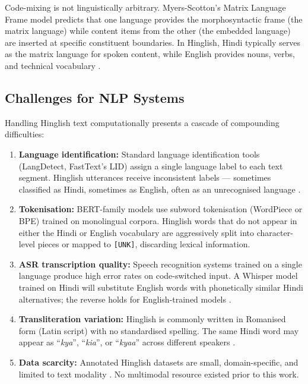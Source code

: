 Code-mixing is not linguistically arbitrary. Myers-Scotton's Matrix Language Frame model predicts that one language provides the morphosyntactic frame (the matrix language) while content items from the other (the embedded language) are inserted at specific constituent boundaries. In Hinglish, Hindi typically serves as the matrix language for spoken content, while English provides nouns, verbs, and technical vocabulary \cite{srinivasan2020code}.

\subsection{Challenges for NLP Systems}

Handling Hinglish text computationally presents a cascade of compounding difficulties:

\begin{enumerate}
    \item \textbf{Language identification:} Standard language identification tools (LangDetect, FastText's LID) assign a single language label to each text segment. Hinglish utterances receive inconsistent labels --- sometimes classified as Hindi, sometimes as English, often as an unrecognised language \cite{aguilar2020lince, barman2014code}.

    \item \textbf{Tokenisation:} BERT-family models use subword tokenisation (WordPiece or BPE) trained on monolingual corpora. Hinglish words that do not appear in either the Hindi or English vocabulary are aggressively split into character-level pieces or mapped to \texttt{[UNK]}, discarding lexical information.

    \item \textbf{ASR transcription quality:} Speech recognition systems trained on a single language produce high error rates on code-switched input. A Whisper model trained on Hindi will substitute English words with phonetically similar Hindi alternatives; the reverse holds for English-trained models \cite{radford2023whisper}.

    \item \textbf{Transliteration variation:} Hinglish is commonly written in Romanised form (Latin script) with no standardised spelling. The same Hindi word may appear as ``\textit{kya}'', ``\textit{kia}'', or ``\textit{kyaa}'' across different speakers \cite{winata2019code}.

    \item \textbf{Data scarcity:} Annotated Hinglish datasets are small, domain-specific, and limited to text modality \cite{joshi2016towards}. No multimodal resource existed prior to this work.
\end{enumerate}

